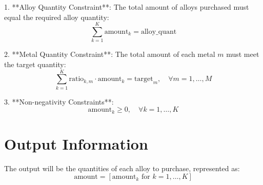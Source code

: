 \documentclass{article}
\begin{document}
1. **Alloy Quantity Constraint**:
   The total amount of alloys purchased must equal the required alloy quantity:
   \[
   \sum_{k=1}^{K} \text{amount}_{k} = \text{alloy\_quant}
   \]

2. **Metal Quantity Constraint**:
   The total amount of each metal \( m \) must meet the target quantity:
   \[
   \sum_{k=1}^{K} \text{ratio}_{k, m} \cdot \text{amount}_{k} = \text{target}_{m}, \quad \forall m=1,\ldots,M
   \]

3. **Non-negativity Constraints**:
   \[
   \text{amount}_{k} \geq 0, \quad \forall k=1,\ldots,K
   \]

\section*{Output Information}

The output will be the quantities of each alloy to purchase, represented as:
\[
\text{amount} = [\text{amount}_{k} \text{ for } k = 1, \ldots, K]
\]
\end{document}
